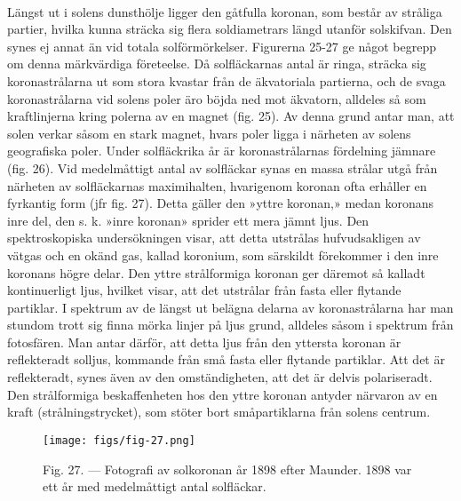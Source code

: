 \documentclass[a4paper, 12pt, oneside, swedish]{article}
\begin{document}
\paragraph{}
Längst ut i solens dunsthölje ligger den gåtfulla koronan, som består av stråliga partier, hvilka kunna sträcka sig flera soldiametrars längd utanför solskifvan. Den synes ej annat än vid totala solförmörkelser. Figurerna 25-27 ge något begrepp om denna märkvärdiga företeelse. Då solfläckarnas antal är ringa, sträcka sig koronastrålarna ut som stora kvastar från de äkvatoriala partierna, och de svaga koronastrålarna vid solens poler äro böjda ned mot äkvatorn, alldeles så som kraftlinjerna kring polerna av en magnet (fig. 25). Av denna grund antar man, att solen verkar såsom en stark magnet, hvars poler ligga i närheten av solens geografiska poler. Under solfläckrika år är koronastrålarnas fördelning jämnare (fig. 26). Vid medelmåttigt antal av solfläckar synas en massa strålar utgå från närheten av solfläckarnas maximihalten, hvarigenom koronan ofta erhåller en fyrkantig form (jfr fig. 27). Detta gäller den »yttre koronan,» medan koronans inre del, den s. k. »inre koronan» sprider ett mera jämnt ljus. Den spektroskopiska undersökningen visar, att detta utstrålas hufvudsakligen av vätgas och en okänd gas, kallad koronium, som särskildt förekommer i den inre koronans högre delar. Den yttre strålformiga koronan ger däremot så kalladt kontinuerligt ljus, hvilket visar, att det utstrålar från fasta eller flytande partiklar. I spektrum av de längst ut belägna delarna av koronastrålarna har man stundom trott sig finna mörka linjer på ljus grund, alldeles såsom i spektrum från fotosfären. Man antar därför, att detta ljus från den yttersta koronan är reflekteradt solljus, kommande från små fasta eller flytande partiklar. Att det är reflekteradt, synes även av den omständigheten, att det är delvis polariseradt. Den strålformiga beskaffenheten hos den yttre koronan antyder närvaron av en kraft (strålningstrycket), som stöter bort småpartiklarna från solens centrum.

\begin{figure}[H]
\centering
\texttt{[image: figs/fig-27.png]}
\caption{Fig. 27. --- Fotografi av solkoronan år 1898 efter Maunder. 1898 var ett år med medelmåttigt antal solfläckar.}
\end{figure}
\end{document}
